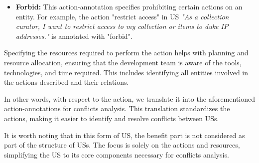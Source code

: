 \begin{definition}
\begin{itemize}
\begin{itemize}
		\item \textbf{Forbid:} This action-annotation specifies prohibiting certain actions on an entity. For example, the action "restrict access" in US \textit{"As a collection curator, I want to restrict access to my collection or items to duke IP addresses."} is annotated with "forbid".
	\end{itemize}
	
	Specifying the resources required to perform the action helps with planning and resource allocation, ensuring that the development team is aware of the tools, technologies, and time required. This includes identifying all entities involved in the actions described and their relations.
	
	In other words, with respect to the action, we translate it into the aforementioned action-annotations for conflicts analysis. This translation standardizes the actions, making it easier to identify and resolve conflicts between USs.
	
	It is worth noting that in this form of US, the benefit part is not considered as part of the structure of USs. The focus is solely on the actions and resources, simplifying the US to its core components necessary for conflicts analysis.

\end{itemize}
\end{definition}
